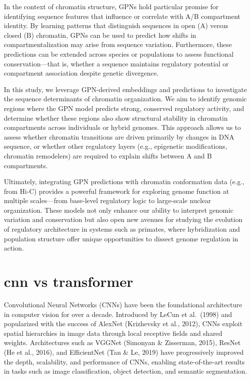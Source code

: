 \documentclass[
  a4paper,
  openany]{scrbook}
\begin{document}
In the context of chromatin structure, GPNs hold particular promise for
identifying sequence features that influence or correlate with A/B
compartment identity. By learning patterns that distinguish sequences in
open (A) versus closed (B) chromatin, GPNs can be used to predict how
shifts in compartmentalization may arise from sequence variation.
Furthermore, these predictions can be extended across species or
populations to assess functional conservation---that is, whether a
sequence maintains regulatory potential or compartment association
despite genetic divergence.

In this study, we leverage GPN-derived embeddings and predictions to
investigate the sequence determinants of chromatin organization. We aim
to identify genomic regions where the GPN model predicts strong,
conserved regulatory activity, and determine whether these regions also
show structural stability in chromatin compartments across individuals
or hybrid genomes. This approach allows us to assess whether chromatin
transitions are driven primarily by changes in DNA sequence, or whether
other regulatory layers (e.g., epigenetic modifications, chromatin
remodelers) are required to explain shifts between A and B compartments.

Ultimately, integrating GPN predictions with chromatin conformation data
(e.g., from Hi-C) provides a powerful framework for exploring genome
function at multiple scales---from base-level regulatory logic to
large-scale nuclear organization. These models not only enhance our
ability to interpret genomic variation and conservation but also open
new avenues for studying the evolution of regulatory architecture in
systems such as primates, where hybridization and population structure
offer unique opportunities to dissect genome regulation in action.

\section{cnn vs transformer}\label{cnn-vs-transformer}

Convolutional Neural Networks (CNNs) have been the foundational
architecture in computer vision for over a decade. Introduced by LeCun
et al.~(1998) and popularized with the success of AlexNet (Krizhevsky et
al., 2012), CNNs exploit spatial hierarchies in image data through local
receptive fields and shared weights. Architectures such as VGGNet
(Simonyan \& Zisserman, 2015), ResNet (He et al., 2016), and
EfficientNet (Tan \& Le, 2019) have progressively improved the depth,
scalability, and performance of CNNs, enabling state-of-the-art results
in tasks such as image classification, object detection, and semantic
segmentation.
\end{document}
